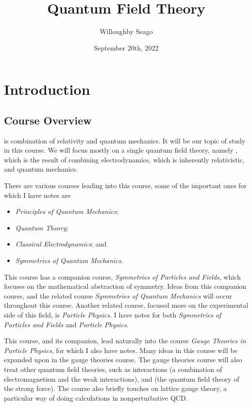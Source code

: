 \documentclass[fleqn]{NotesClass}
\title{Quantum Field Theory}
\author{Willoughby Seago}
\date{September 20th, 2022}
\newcommand*{\course}[1]{\textit{#1}}
\begin{document}
    \frontmatter
    \titlepage
    \tableofcontents
    \listoffigures
    \mainmatter
    
    \chapter{Introduction}
    \section{Course Overview}
     is combination of relativity and quantum mechanics.
    It will be our topic of study in this course.
    We will focus mostly on a single quantum field theory, namely , which is the result of combining electrodynamics, which is inherently relativistic, and quantum mechanics.
    
    There are various courses leading into this course, some of the important ones for which I have notes are
    \begin{itemize}
        \item \course{Principles of Quantum Mechanics};
        \item \course{Quantum Theory};
        \item \course{Classical Electrodynamics}; and
        \item \course{Symmetries of Quantum Mechanics}.
    \end{itemize}
    This course has a companion course, \course{Symmetries of Particles and Fields}, which focuses on the mathematical abstraction of symmetry.
    Ideas from this companion course, and the related course \course{Symmetries of Quantum Mechanics} will occur throughout this course.
    Another related course, focused more on the experimental side of this field, is \course{Particle Physics}.
    I have notes for both \course{Symmetries of Particles and Fields} and \course{Particle Physics}.
    
    This course, and its companion, lead naturally into the course \course{Gauge Theories in Particle Physics}, for which I also have notes.
    Many ideas in this course will be expanded upon in the gauge theories course.
    The gauge theories course will also treat other quantum field theories, such as  interactions (a combination of electromagnetism and the weak interactions), and  (the quantum field theory of the strong force).
    The course also briefly touches on lattice gauge theory, a particular way of doing calculations in nonperturbative QCD.
    
\end{document}
